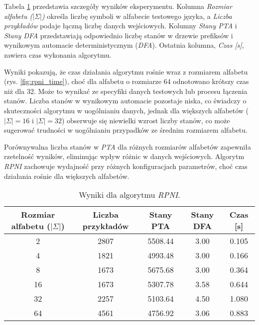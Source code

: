 Tabela \ref{tab:rpni_results} przedstawia szczegóły wyników eksperymentu. Kolumna \textit{Rozmiar alfabetu (\(|\Sigma|\))} określa liczbę symboli w alfabecie testowego języka, a \textit{Liczba przykładów} podaje łączną liczbę danych wejściowych. Kolumny \textit{Stany PTA} i \textit{Stany DFA} przedstawiają odpowiednio liczbę stanów w drzewie prefiksów i wynikowym automacie deterministycznym (\textit{DFA}). Ostatnia kolumna, \textit{Czas [s]}, zawiera czas wykonania algorytmu.  

Wyniki pokazują, że czas działania algorytmu rośnie wraz z rozmiarem alfabetu (rys. \ref{fig:rpni_time}), choć dla alfabetu o rozmiarze 64 odnotowano krótszy czas niż dla 32. Może to wynikać ze specyfiki danych testowych lub procesu łączenia stanów. Liczba stanów w wynikowym automacie pozostaje niska, co świadczy o skuteczności algorytmu w uogólnianiu danych, jednak dla większych alfabetów (\(|\Sigma| = 16\) i \(|\Sigma| = 32\)) obserwuje się niewielki wzrost liczby stanów, co może sugerować trudności w uogólnianiu przypadków ze średnim rozmiarem alfabetu.  

Porównywalna liczba stanów w \textit{PTA} dla różnych rozmiarów alfabetów zapewniła rzetelność wyników, eliminując wpływ różnic w danych wejściowych. Algorytm \textit{RPNI} zachowuje wydajność przy różnych konfiguracjach parametrów, choć czas działania rośnie dla większych alfabetów.

\begin{table}[ht]
\centering
\caption{Wyniki dla algorytmu \textit{RPNI}.}
\label{tab:rpni_results}
\begin{tabular}{|c|c|c|c|c|}
\hline
Rozmiar alfabetu (\(|\Sigma|\)) & Liczba przykładów & Stany PTA & Stany DFA & Czas [s] \\ \hline
\num{2}                         & \num{2807}        & \num{5508.44} & \num{3.00}      & \num{0.105} \\ \hline
\num{4}                         & \num{1821}        & \num{4993.48} & \num{3.00}      & \num{0.166} \\ \hline
\num{8}                         & \num{1673}        & \num{5675.68} & \num{3.00}      & \num{0.364} \\ \hline
\num{16}                        & \num{1673}        & \num{5307.78} & \num{3.58}   & \num{0.644} \\ \hline
\num{32}                        & \num{2257}        & \num{5103.64} & \num{4.50}   & \num{1.080} \\ \hline
\num{64}                        & \num{4561}        & \num{4756.92} & \num{3.06}   & \num{0.883} \\ \hline
\end{tabular}
\end{table}

